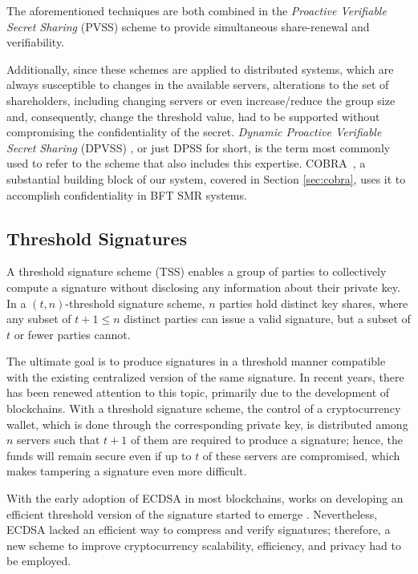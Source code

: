 The aforementioned techniques are both combined in the \textit{Proactive Verifiable Secret Sharing} (PVSS) scheme \cite{pvss} to provide simultaneous share-renewal and verifiability.

Additionally, since these schemes are applied to distributed systems, which are always susceptible to changes in the available servers, alterations to the set of shareholders, including changing servers or even increase/reduce the group size and, consequently, change the threshold value, had to be supported without compromising the confidentiality of the secret. \textit{Dynamic Proactive Verifiable Secret Sharing} (DPVSS) \cite{mpss}, or just DPSS for short, is the term most commonly used to refer to the scheme that also includes this expertise. COBRA~\cite{cobra}, a substantial building block of our system, covered in Section \ref{sec:cobra}, uses it to accomplish confidentiality in BFT SMR systems.

\subsection{Threshold Signatures} \label{subsec:threshold-signatures}

A threshold signature scheme (TSS) enables a group of parties to collectively compute a signature without disclosing any information about their private key. In a $(t, n)$-threshold signature scheme, $n$ parties hold distinct key shares, where any subset of $t + 1 \le n$ distinct parties can issue a valid signature, but a subset of $t$ or fewer parties cannot.

The ultimate goal is to produce signatures in a threshold manner compatible with the existing centralized version of the same signature. In recent years, there has been renewed attention to this topic, primarily due to the development of blockchains. With a threshold signature scheme, the control of a cryptocurrency wallet, which is done through the corresponding private key, is distributed among $n$ servers such that $t + 1$ of them are required to produce a signature; hence, the funds will remain secure even if up to $t$ of these servers are compromised, which makes tampering a signature even more difficult.

With the early adoption of ECDSA in most blockchains, works on developing an efficient threshold version of the signature started to emerge \cite{gennaro18,lindell18,ecdsasurvey}. Nevertheless, ECDSA lacked an efficient way to compress and verify signatures; therefore, a new scheme to improve cryptocurrency scalability, efficiency, and privacy had to be employed. 

